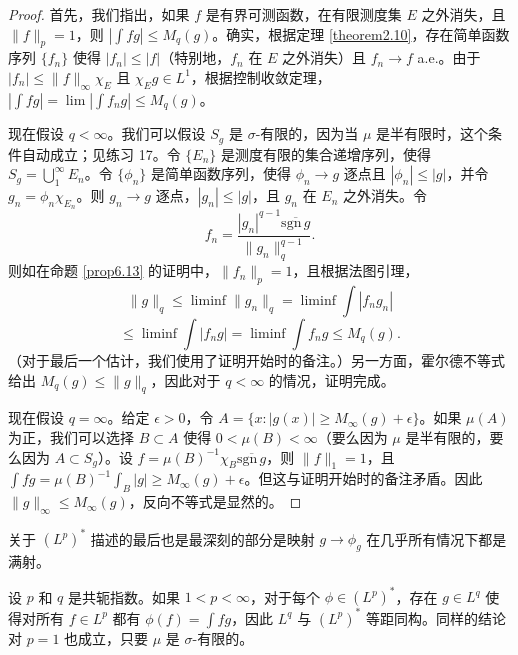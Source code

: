 \documentclass[lang=cn,10pt,thmcnt=section]{elegantbook}
\begin{document}
\begin{proof}
首先，我们指出，如果 $f$ 是有界可测函数，在有限测度集 $E$ 之外消失，且 $\|f\|_p = 1$，则 $|\int fg| \leq M_q(g)$。确实，根据定理 \ref{theorem2.10}，存在简单函数序列 $\{f_n\}$ 使得 $|f_n| \leq |f|$（特别地，$f_n$ 在 $E$ 之外消失）且 $f_n \to f$ a.e.。由于 $|f_n| \leq \|f\|_\infty\chi_E$ 且 $\chi_Eg \in L^1$，根据控制收敛定理，$|\int fg| = \lim |\int f_ng| \leq M_q(g)$。

现在假设 $q < \infty$。我们可以假设 $S_g$ 是 $\sigma$-有限的，因为当 $\mu$ 是半有限时，这个条件自动成立；见练习 17。令 $\{E_n\}$ 是测度有限的集合递增序列，使得 $S_g = \bigcup_1^\infty E_n$。令 $\{\phi_n\}$ 是简单函数序列，使得 $\phi_n \to g$ 逐点且 $|\phi_n| \leq |g|$，并令 $g_n = \phi_n\chi_{E_n}$。则 $g_n \to g$ 逐点，$|g_n| \leq |g|$，且 $g_n$ 在 $E_n$ 之外消失。令
\[ f_n = \frac{|g_n|^{q-1}\overline{\text{sgn}\,g}}{\|g_n\|_q^{q-1}}. \]
则如在命题 \ref{prop6.13} 的证明中，$\|f_n\|_p = 1$，且根据法图引理，
\[ \|g\|_q \leq \liminf \|g_n\|_q = \liminf \int |f_ng_n| \]
\[ \leq \liminf \int |f_ng| = \liminf \int f_ng \leq M_q(g). \]
（对于最后一个估计，我们使用了证明开始时的备注。）另一方面，霍尔德不等式给出 $M_q(g) \leq \|g\|_q$，因此对于 $q < \infty$ 的情况，证明完成。

现在假设 $q = \infty$。给定 $\epsilon > 0$，令 $A = \{x : |g(x)| \geq M_\infty(g) + \epsilon\}$。如果 $\mu(A)$ 为正，我们可以选择 $B \subset A$ 使得 $0 < \mu(B) < \infty$（要么因为 $\mu$ 是半有限的，要么因为 $A \subset S_g$）。设 $f = \mu(B)^{-1}\chi_B\overline{\text{sgn}\,g}$，则 $\|f\|_1 = 1$，且 $\int fg = \mu(B)^{-1}\int_B |g| \geq M_\infty(g) + \epsilon$。但这与证明开始时的备注矛盾。因此 $\|g\|_\infty \leq M_\infty(g)$，反向不等式是显然的。
\end{proof}

关于 $(L^p)^*$ 描述的最后也是最深刻的部分是映射 $g \to \phi_g$ 在几乎所有情况下都是满射。

\begin{theorem}\label{theorem6.15}
设 $p$ 和 $q$ 是共轭指数。如果 $1 < p < \infty$，对于每个 $\phi \in (L^p)^*$，存在 $g \in L^q$ 使得对所有 $f \in L^p$ 都有 $\phi(f) = \int fg$，因此 $L^q$ 与 $(L^p)^*$ 等距同构。同样的结论对 $p=1$ 也成立，只要 $\mu$ 是 $\sigma$-有限的。
\end{theorem}
\end{document}
